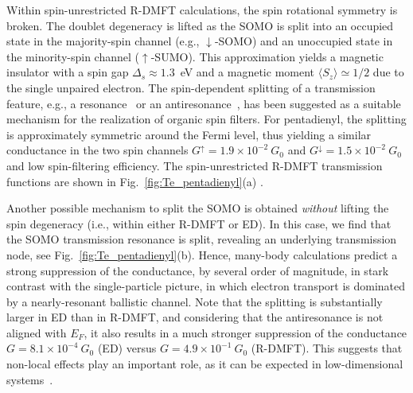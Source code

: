 \documentclass[aps,prx,twocolumn,superscriptaddress]{revtex4-2}
\begin{document}
Within spin-unrestricted R-DMFT calculations, the spin rotational symmetry is broken. 
The doublet degeneracy is lifted as the SOMO is split into 
an occupied state in the majority-spin channel (e.g., $\downarrow$-SOMO) and 
an unoccupied state in the minority-spin channel ($\uparrow$-SUMO). 
This approximation yields a magnetic insulator with a spin gap $\Delta_s \approx 1.3$~eV 
and a magnetic moment $\langle S_z \rangle \simeq 1/2$ due to the single unpaired electron. 
The spin-dependent splitting of a transmission feature, e.g., 
a resonance~\cite{herrmann2010organic,herrmann2011designing,smeu2010calculations} 
or an antiresonance~\cite{valliNL18,valliPRB100}, 
has been suggested as a suitable mechanism for the realization of organic spin filters. 
For pentadienyl, the splitting is approximately symmetric around the Fermi level, 
thus yielding a similar conductance in the two spin channels 
$G^{\uparrow}=1.9 \times 10^{-2} \ G_0$ and $G^{\downarrow}=1.5 \times 10^{-2} \ G_0$ 
and low spin-filtering efficiency.  %
The spin-unrestricted R-DMFT transmission functions 
are shown in Fig.~\ref{fig:Te_pentadienyl}(a) .

Another possible mechanism to split the SOMO is obtained
\emph{without} lifting the spin degeneracy (i.e., within either R-DMFT or ED).
In this case, we find that the SOMO transmission resonance is split,  
revealing an underlying transmission node, see Fig.~\ref{fig:Te_pentadienyl}(b).
Hence, many-body calculations predict a strong suppression of the conductance, 
by several order of magnitude, in stark contrast with the single-particle picture, 
in which electron transport is dominated by a nearly-resonant ballistic channel.  
Note that the splitting is substantially larger in ED than in R-DMFT, 
and considering that the antiresonance is not aligned with $E_F$, 
it also results in a much stronger suppression of the conductance 
$G=8.1 \times 10^{-4} \ G_0$ (ED) versus $G=4.9 \times 10^{-1} \ G_0$ (R-DMFT). 
This suggests that non-local effects
play an important role, as it can be expected in low-dimensional systems~\cite{valliPRB91,pudleiner2019parquet}.
\end{document}
